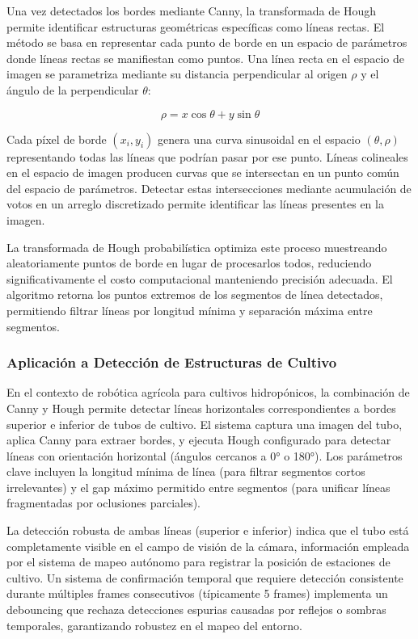 Una vez detectados los bordes mediante Canny, la transformada de Hough permite identificar estructuras geométricas específicas como líneas rectas. El método se basa en representar cada punto de borde en un espacio de parámetros donde líneas rectas se manifiestan como puntos. Una línea recta en el espacio de imagen se parametriza mediante su distancia perpendicular al origen $\rho$ y el ángulo de la perpendicular $\theta$:

\begin{equation}
\rho = x \cos\theta + y \sin\theta
\end{equation}

Cada píxel de borde $(x_i, y_i)$ genera una curva sinusoidal en el espacio $(\theta, \rho)$ representando todas las líneas que podrían pasar por ese punto. Líneas colineales en el espacio de imagen producen curvas que se intersectan en un punto común del espacio de parámetros. Detectar estas intersecciones mediante acumulación de votos en un arreglo discretizado permite identificar las líneas presentes en la imagen.

La transformada de Hough probabilística optimiza este proceso muestreando aleatoriamente puntos de borde en lugar de procesarlos todos, reduciendo significativamente el costo computacional manteniendo precisión adecuada. El algoritmo retorna los puntos extremos de los segmentos de línea detectados, permitiendo filtrar líneas por longitud mínima y separación máxima entre segmentos.

\subsubsection{Aplicación a Detección de Estructuras de Cultivo}

En el contexto de robótica agrícola para cultivos hidropónicos, la combinación de Canny y Hough permite detectar líneas horizontales correspondientes a bordes superior e inferior de tubos de cultivo. El sistema captura una imagen del tubo, aplica Canny para extraer bordes, y ejecuta Hough configurado para detectar líneas con orientación horizontal (ángulos cercanos a 0° o 180°). Los parámetros clave incluyen la longitud mínima de línea (para filtrar segmentos cortos irrelevantes) y el gap máximo permitido entre segmentos (para unificar líneas fragmentadas por oclusiones parciales).

La detección robusta de ambas líneas (superior e inferior) indica que el tubo está completamente visible en el campo de visión de la cámara, información empleada por el sistema de mapeo autónomo para registrar la posición de estaciones de cultivo. Un sistema de confirmación temporal que requiere detección consistente durante múltiples frames consecutivos (típicamente 5 frames) implementa un debouncing que rechaza detecciones espurias causadas por reflejos o sombras temporales, garantizando robustez en el mapeo del entorno.
